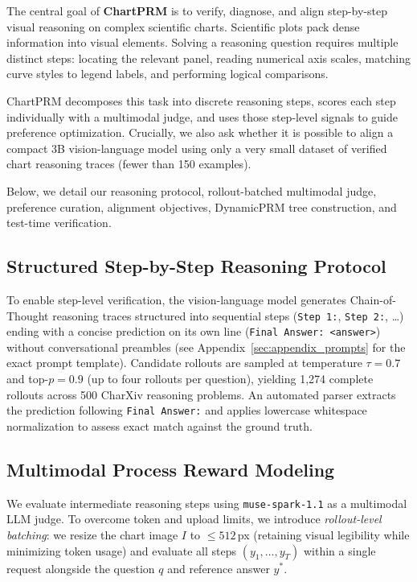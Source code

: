 \documentclass[11pt]{article}
\begin{document}
The central goal of \textbf{ChartPRM} is to verify, diagnose, and align step-by-step visual reasoning on complex scientific charts. Scientific plots pack dense information into visual elements. Solving a reasoning question requires multiple distinct steps: locating the relevant panel, reading numerical axis scales, matching curve styles to legend labels, and performing logical comparisons.

ChartPRM decomposes this task into discrete reasoning steps, scores each step individually with a multimodal judge, and uses those step-level signals to guide preference optimization. Crucially, we also ask whether it is possible to align a compact 3B vision-language model using only a very small dataset of verified chart reasoning traces (fewer than 150 examples).

Below, we detail our reasoning protocol, rollout-batched multimodal judge, preference curation, alignment objectives, DynamicPRM tree construction, and test-time verification.

\subsection{Structured Step-by-Step Reasoning Protocol}
\label{subsec:reasoning_protocol}
To enable step-level verification, the vision-language model generates Chain-of-Thought reasoning traces \citep{wei2022cot} structured into sequential steps (\texttt{Step 1:}, \texttt{Step 2:}, \dots) ending with a concise prediction on its own line (\texttt{Final Answer: <answer>}) without conversational preambles (see Appendix~\ref{sec:appendix_prompts} for the exact prompt template). Candidate rollouts are sampled at temperature $\tau = 0.7$ and top-$p = 0.9$ (up to four rollouts per question), yielding 1,274 complete rollouts across 500 CharXiv \citep{wang2024charxiv} reasoning problems. An automated parser extracts the prediction following \texttt{Final Answer:} and applies lowercase whitespace normalization to assess exact match against the ground truth.

\subsection{Multimodal Process Reward Modeling}
\label{subsec:prm_judge}
We evaluate intermediate reasoning steps using \texttt{muse-spark-1.1} \citep{meta2026musespark, zheng2023judging} as a multimodal LLM judge. To overcome token and upload limits, we introduce \textit{rollout-level batching}: we resize the chart image $I$ to $\le 512$\,px (retaining visual legibility while minimizing token usage) and evaluate all steps $(y_1, \dots, y_T)$ within a single request alongside the question $q$ and reference answer $y^*$. 
\end{document}
